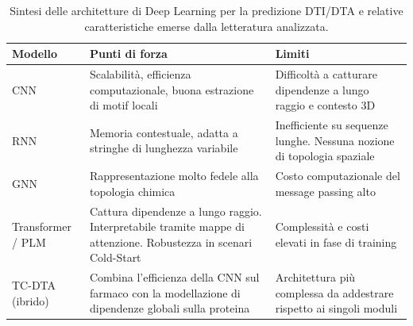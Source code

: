 \begin{table}[h]
\centering
\renewcommand{\arraystretch}{1.3}
\begin{tabularx}{\textwidth}{|p{2.3cm}|X|X|}
\hline
\textbf{Modello} & \textbf{Punti di forza} & \textbf{Limiti} \\
\hline
CNN &
Scalabilità, efficienza computazionale, buona estrazione di motif locali &
Difficoltà a catturare dipendenze a lungo raggio e contesto 3D \\
\hline
RNN &
Memoria contestuale, adatta a stringhe di lunghezza variabile &
Inefficiente su sequenze lunghe. Nessuna nozione di topologia spaziale \\
\hline
GNN &
Rappresentazione molto fedele alla topologia chimica &
Costo computazionale del message passing alto \\
\hline
Transformer / PLM &
Cattura dipendenze a lungo raggio. Interpretabile tramite mappe di attenzione. Robustezza in scenari Cold-Start &
Complessità e costi elevati in fase di training \\
\hline
TC-DTA (ibrido) &
Combina l'efficienza della CNN sul farmaco con la modellazione di dipendenze globali sulla proteina &
Architettura più complessa da addestrare rispetto ai singoli moduli \\
\hline
\end{tabularx}
\caption{Sintesi delle architetture di Deep Learning per la predizione DTI/DTA e relative caratteristiche emerse dalla letteratura analizzata.}
\label{tab:modelli_dti_dta}
\end{table}

